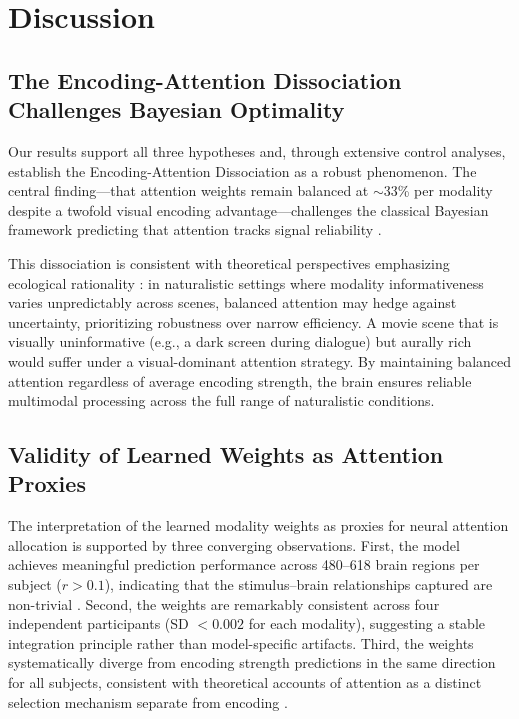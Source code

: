 \documentclass[conference]{IEEEtran}
\begin{document}
\section{Discussion}

\subsection{The Encoding-Attention Dissociation Challenges Bayesian Optimality}

Our results support all three hypotheses and, through extensive control analyses, establish the Encoding-Attention Dissociation as a robust phenomenon. The central finding---that attention weights remain balanced at $\sim$33\% per modality despite a twofold visual encoding advantage---challenges the classical Bayesian framework predicting that attention tracks signal reliability \cite{ernst2002humans, knill2004bayesian}.

This dissociation is consistent with theoretical perspectives emphasizing ecological rationality \cite{gigerenzer2009homo}: in naturalistic settings where modality informativeness varies unpredictably across scenes, balanced attention may hedge against uncertainty, prioritizing robustness over narrow efficiency. A movie scene that is visually uninformative (e.g., a dark screen during dialogue) but aurally rich would suffer under a visual-dominant attention strategy. By maintaining balanced attention regardless of average encoding strength, the brain ensures reliable multimodal processing across the full range of naturalistic conditions.

\subsection{Validity of Learned Weights as Attention Proxies}

The interpretation of the learned modality weights as proxies for neural attention allocation is supported by three converging observations. First, the model achieves meaningful prediction performance across 480--618 brain regions per subject ($r > 0.1$), indicating that the stimulus--brain relationships captured are non-trivial \cite{kriegeskorte2008representational, yamins2016using}. Second, the weights are remarkably consistent across four independent participants (SD $< 0.002$ for each modality), suggesting a stable integration principle rather than model-specific artifacts. Third, the weights systematically diverge from encoding strength predictions in the same direction for all subjects, consistent with theoretical accounts of attention as a distinct selection mechanism separate from encoding \cite{lindsay2020attention}.
\end{document}
